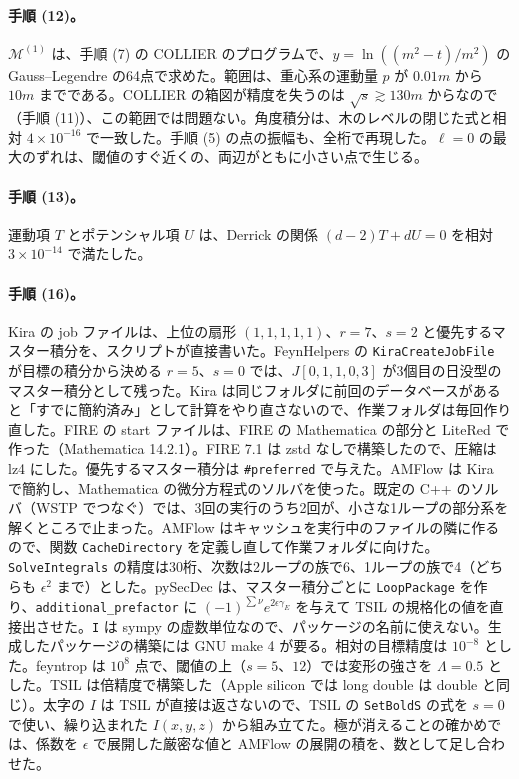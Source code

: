 \documentclass[a4paper,10pt]{ltjsarticle}
\begin{document}
\paragraph{手順 (12)。}$\mathcal{M}^{(1)}$ は、手順 (7) の COLLIER のプログラムで、$y=\ln((m^2-t)/m^2)$ の Gauss--Legendre の64点で求めた。範囲は、重心系の運動量 $p$ が $0.01m$ から $10m$ までである。COLLIER の箱図が精度を失うのは $\sqrt s\gtrsim130m$ からなので（手順 (11)）、この範囲では問題ない。角度積分は、木のレベルの閉じた式と相対 $4\times10^{-16}$ で一致した。手順 (5) の点の振幅も、全桁で再現した。$\ell=0$ の最大のずれは、閾値のすぐ近くの、両辺がともに小さい点で生じる。

\paragraph{手順 (13)。}運動項 $T$ とポテンシャル項 $U$ は、Derrick の関係 $(d-2)T+dU=0$ を相対 $3\times10^{-14}$ で満たした。

\paragraph{手順 (16)。}Kira の job ファイルは、上位の扇形 $(1,1,1,1,1)$、$r=7$、$s=2$ と優先するマスター積分を、スクリプトが直接書いた。FeynHelpers の \texttt{KiraCreateJobFile} が目標の積分から決める $r=5$、$s=0$ では、$J[0,1,1,0,3]$ が3個目の日没型のマスター積分として残った。Kira は同じフォルダに前回のデータベースがあると「すでに簡約済み」として計算をやり直さないので、作業フォルダは毎回作り直した。FIRE の start ファイルは、FIRE の Mathematica の部分と LiteRed で作った（Mathematica 14.2.1）。FIRE 7.1 は zstd なしで構築したので、圧縮は lz4 にした。優先するマスター積分は \texttt{\#preferred} で与えた。AMFlow は Kira で簡約し、Mathematica の微分方程式のソルバを使った。既定の C++ のソルバ（WSTP でつなぐ）では、3回の実行のうち2回が、小さな1ループの部分系を解くところで止まった。AMFlow はキャッシュを実行中のファイルの隣に作るので、関数 \texttt{CacheDirectory} を定義し直して作業フォルダに向けた。\texttt{SolveIntegrals} の精度は30桁、次数は2ループの族で6、1ループの族で4（どちらも $\epsilon^2$ まで）とした。pySecDec は、マスター積分ごとに \texttt{LoopPackage} を作り、\texttt{additional\_prefactor} に $(-1)^{\sum\nu}e^{2\epsilon\gamma_E}$ を与えて TSIL の規格化の値を直接出させた。\texttt{I} は sympy の虚数単位なので、パッケージの名前に使えない。生成したパッケージの構築には GNU make 4 が要る。相対の目標精度は $10^{-8}$ とした。feyntrop は $10^8$ 点で、閾値の上（$s=5$、$12$）では変形の強さを $\Lambda=0.5$ とした。TSIL は倍精度で構築した（Apple silicon では long double は double と同じ）。太字の $I$ は TSIL が直接は返さないので、TSIL の \texttt{SetBoldS} の式を $s=0$ で使い、繰り込まれた $I(x,y,z)$ から組み立てた。極が消えることの確かめでは、係数を $\epsilon$ で展開した厳密な値と AMFlow の展開の積を、数として足し合わせた。
\end{document}
